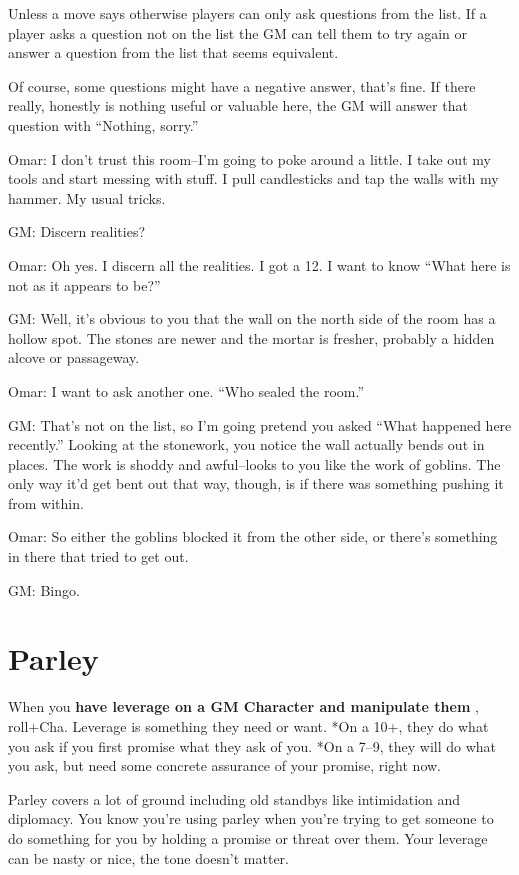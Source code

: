  Unless a move says otherwise players can only ask questions from the list. If a player asks a question not on the list the GM can tell them to try again or answer a question from the list that seems equivalent.


 Of course, some questions might have a negative answer, that's fine. If there really, honestly is nothing useful or valuable here, the GM will answer that question with ``Nothing, sorry.''


 Omar: I don't trust this room--I'm going to poke around a little. I take out my tools and start messing with stuff. I pull candlesticks and tap the walls with my hammer. My usual tricks.


 GM: Discern realities?


 Omar: Oh yes. I discern all the realities. I got a 12. I want to know ``What here is not as it appears to be?''


 GM: Well, it's obvious to you that the wall on the north side of the room has a hollow spot. The stones are newer and the mortar is fresher, probably a hidden alcove or passageway.


 Omar: I want to ask another one. ``Who sealed the room.''


 GM: That's not on the list, so I'm going pretend you asked ``What happened here recently.'' Looking at the stonework, you notice the wall actually bends out in places. The work is shoddy and awful--looks to you like the work of goblins. The only way it'd get bent out that way, though, is if there was something pushing it from within.


 Omar: So either the goblins blocked it from the other side, or there's something in there that tried to get out.


 GM: Bingo.
\section{Parley}


 When you \textbf{have leverage on a GM Character and manipulate them}
, roll+Cha. Leverage is something they need or want. *On a 10+, they do what you ask if you first promise what they ask of you. *On a 7--9, they will do what you ask, but need some concrete assurance of your promise, right now.


 Parley covers a lot of ground including old standbys like intimidation and diplomacy. You know you're using parley when you're trying to get someone to do something for you by holding a promise or threat over them. Your leverage can be nasty or nice, the tone doesn't matter.


